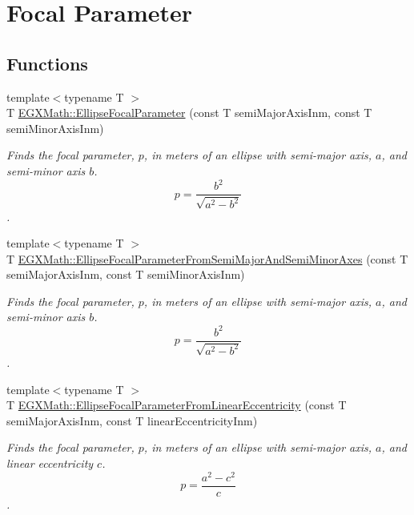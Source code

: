 \hypertarget{group___e_g_x_math-_geometry-2_d-_ellipse-_focal_parameter}{}\section{Focal Parameter}
\label{group___e_g_x_math-_geometry-2_d-_ellipse-_focal_parameter}
\subsection*{Functions}
\begin{DoxyCompactItemize}
\item 
{\footnotesize template$<$typename T $>$ }\\T \mbox{\hyperlink{group___e_g_x_math-_geometry-2_d-_ellipse-_focal_parameter_ga4cd01a38c72c092ef9791351948bf69b}{E\+G\+X\+Math\+::\+Ellipse\+Focal\+Parameter}} (const T semi\+Major\+Axis\+Inm, const T semi\+Minor\+Axis\+Inm)
\begin{DoxyCompactList}\small\item\em Finds the focal parameter, $p$, in meters of an ellipse with semi-\/major axis, $a$, and semi-\/minor axis $b$. \[ p=\frac{b^2}{\sqrt{a^2-b^2}} \]. \end{DoxyCompactList}\item 
{\footnotesize template$<$typename T $>$ }\\T \mbox{\hyperlink{group___e_g_x_math-_geometry-2_d-_ellipse-_focal_parameter_ga406c026954d4f5b357e0310461ed4d1d}{E\+G\+X\+Math\+::\+Ellipse\+Focal\+Parameter\+From\+Semi\+Major\+And\+Semi\+Minor\+Axes}} (const T semi\+Major\+Axis\+Inm, const T semi\+Minor\+Axis\+Inm)
\begin{DoxyCompactList}\small\item\em Finds the focal parameter, $p$, in meters of an ellipse with semi-\/major axis, $a$, and semi-\/minor axis $b$. \[ p=\frac{b^2}{\sqrt{a^2-b^2}} \]. \end{DoxyCompactList}\item 
{\footnotesize template$<$typename T $>$ }\\T \mbox{\hyperlink{group___e_g_x_math-_geometry-2_d-_ellipse-_focal_parameter_ga61d3b31a8a32b43634b2ea89a83bc6a5}{E\+G\+X\+Math\+::\+Ellipse\+Focal\+Parameter\+From\+Linear\+Eccentricity}} (const T semi\+Major\+Axis\+Inm, const T linear\+Eccentricity\+Inm)
\begin{DoxyCompactList}\small\item\em Finds the focal parameter, $p$, in meters of an ellipse with semi-\/major axis, $a$, and linear eccentricity $c$. \[ p=\frac{a^2-c^2}{c} \]. \end{DoxyCompactList}\item 

\end{DoxyCompactItemize}
